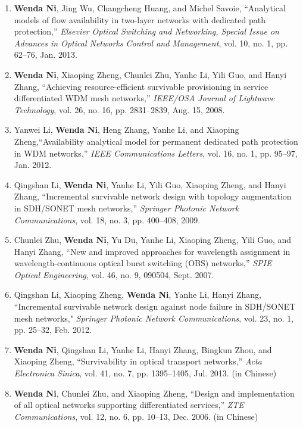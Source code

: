 \documentclass[letterpaper,11pt]{article}
\begin{document}
\begin{enumerate}
\item
\textbf{Wenda Ni}, Jing Wu, Changcheng Huang, and Michel Savoie, ``Analytical models of flow availability in two-layer networks with dedicated path protection,'' \textit{Elsevier Optical Switching and Networking, Special Issue on Advances in Optical Networks Control and Management}, vol. 10, no. 1, pp. 62--76, Jan. 2013.

\item
\textbf{Wenda Ni}, Xiaoping Zheng, Chunlei Zhu, Yanhe Li, Yili Guo, and Hanyi Zhang, ``Achieving resource-efficient survivable provisioning in service differentiated WDM mesh networks,'' \textit{IEEE/OSA Journal of Lightwave Technology}, vol. 26, no. 16, pp. 2831--2839, Aug. 15, 2008.

\item
Yanwei Li, \textbf{Wenda Ni}, Heng Zhang, Yanhe Li, and Xiaoping Zheng,``Availability analytical model for permanent dedicated path protection in WDM networks,'' \textit{IEEE Communications Letters}, vol. 16, no. 1, pp. 95--97, Jan. 2012.

\item
Qingshan Li, \textbf{Wenda Ni}, Yanhe Li, Yili Guo, Xiaoping Zheng, and Hanyi Zhang, ``Incremental survivable network design with topology augmentation in SDH/SONET mesh networks,'' \textit{Springer Photonic Network Communications}, vol. 18, no. 3, pp. 400--408,
2009.

\item
Chunlei Zhu, \textbf{Wenda Ni}, Yu Du, Yanhe Li, Xiaoping Zheng, Yili Guo, and Hanyi Zhang, ``New and improved approaches for wavelength assignment in wavelength-continuous optical burst switching (OBS) networks,'' \textit{SPIE Optical Engineering}, vol. 46, no. 9, 090504, Sept. 2007.

\item
Qingshan Li, Xiaoping Zheng, \textbf{Wenda Ni}, Yanhe Li, Hanyi Zhang, ``Incremental survivable network design against node failure in SDH/SONET mesh networks," \textit{Springer Photonic Network Communications}, vol. 23, no. 1, pp. 25--32, Feb. 2012.

\item
\textbf{Wenda Ni}, Qingshan Li, Yanhe Li, Hanyi Zhang, Bingkun Zhou, and Xiaoping Zheng, ``Survivability in optical transport networks,'' \textit{Acta Electronica Sinica}, vol. 41, no. 7, pp. 1395--1405, Jul. 2013. (in Chinese)

\item
\textbf{Wenda Ni}, Chunlei Zhu, and Xiaoping Zheng, ``Design and implementation of all optical networks supporting differentiated services,'' \textit{ZTE Communications}, vol. 12, no. 6, pp. 10--13, Dec. 2006. (in Chinese)
\end{enumerate}
\end{document}

